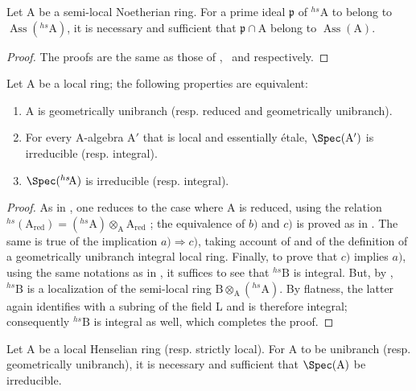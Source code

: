 \begin{corollary}[18.8.14]
\label{IV.18.8.14}
Let $\mathrm{A}$ be a semi-local Noetherian ring.
For a prime ideal $\mathfrak{p}$ of ${}^{hs}\!\mathrm{A}$ to belong to $\operatorname{Ass}({}^{hs}\!\mathrm{A})$, it is necessary and sufficient that $\mathfrak{p}\cap\mathrm{A}$ belong to $\operatorname{Ass}(\mathrm{A})$.
\end{corollary}

\begin{proof}
The proofs are the same as those of ,~ and  respectively.
\end{proof}

\begin{proposition}[18.8.15]
\label{IV.18.8.15}
Let $\mathrm{A}$ be a local ring;
the following properties are equivalent:
\begin{enumerate}[label=\emph{\alph*)}]
  \item A is geometrically unibranch (resp. reduced and geometrically unibranch).
  \item For every A-algebra $\mathrm{A}'$ that is local and essentially \'{e}tale, $\Spec(\mathrm{A}')$ is irreducible (resp. integral).
  \item $\Spec({}^{hs}\!\mathrm{A})$ is irreducible (resp. integral).
\end{enumerate}
\end{proposition}

\begin{proof}
As in , one reduces to the case where A is reduced, using the relation ${}^{hs}(\mathrm{A}_{\mathrm{red}})=({}^{hs}\!\mathrm{A})\otimes_{\mathrm{A}}\mathrm{A}_{\mathrm{red}}$ ; the equivalence of $b)$ and $c)$ is proved as in .  The same is true of the implication $a)\Rightarrow c)$, taking account of  and of the definition of a geometrically unibranch integral local ring.
Finally, to prove that $c)$ implies $a)$, using the same notations as in , it suffices to see that ${}^{hs}\!\mathrm{B}$ is integral.
But, by , ${}^{hs}\!\mathrm{B}$ is a localization of the semi-local ring $\mathrm{B}\otimes_{\mathrm{A}}({}^{hs}\!\mathrm{A})$.  By flatness, the latter again identifies with a subring of the field L and is therefore integral; consequently ${}^{hs}\!\mathrm{B}$ is integral as well, which completes the proof.
\end{proof}

\begin{corollary}[18.8.16]
\label{IV.18.8.16}
Let $\mathrm{A}$ be a local Henselian ring (resp. strictly local).
For A to be unibranch (resp. geometrically unibranch), it is necessary and sufficient that $\Spec(\mathrm{A})$ be irreducible.
\end{corollary}

